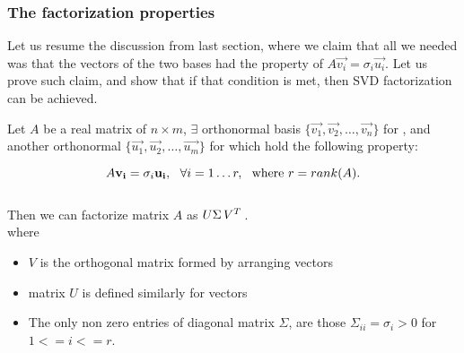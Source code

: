 \subsubsection{The factorization properties}

Let us resume the discussion from last section, where we claim that
all we needed  was that the vectors of
the two bases had the property of $A\vec{v_i} =
\sigma_i\vec{u_i}$. Let us prove such claim, and show that if that
condition is met, then SVD factorization can be achieved. \\

\begin{theorem}
\label{thm:SVD1}
Let $A$ be a real matrix of $n \times m$, $\exists$
orthonormal basis $\{\vec{v_1},\vec{v_2},\dots,\vec{v_n}\}$ for ,
and another orthonormal $\{\vec{u_1},\vec{u_2},\dots,\vec{u_m}\}$ for
 which hold the following property:

\[
A\mathbf{v_i} = \sigma_i\mathbf{u_i}, \,\,\,\,\forall i=1 \dots r, \,\,\,\,\text{where
} r = rank(A).
\]
\\
Then we can factorize matrix $A$ as $U \Sigma \,{V}^{T}\,$. \\

where 

\begin{itemize}
\item $V$ is the orthogonal matrix formed by arranging vectors
\item matrix $U$ is defined similarly for vectors
\item The only non zero entries of diagonal matrix $\Sigma$, are 
those $\Sigma_{ii} = \sigma_i > 0$ for $1 <= i <= r$.
\end{itemize}
\end{theorem}
\hfill

